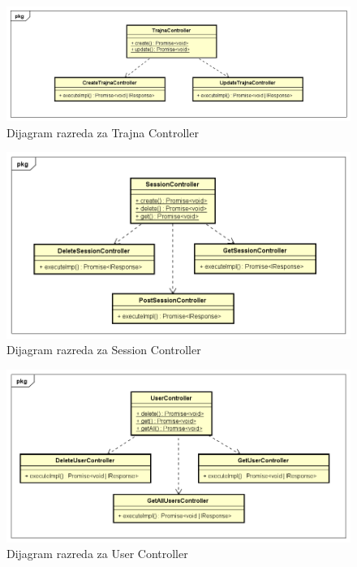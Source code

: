 		\begin{figure}[H]
			\includegraphics[width=1\linewidth]{dijagrami/Dijagram razreda - TrajnaController.png}
			\caption{Dijagram razreda za Trajna Controller}
			\label{fig:Dijagram razreda - TrajnaController} 
		\end{figure}
		
		\begin{figure}[H]
			\includegraphics[width=1\linewidth]{dijagrami/Dijagram razreda - SessionController.png}
			\caption{Dijagram razreda za Session Controller}
			\label{fig:Dijagram razreda - SessionController} 
		\end{figure}
		
		\begin{figure}[H]
			\includegraphics[width=1\linewidth]{dijagrami/Dijagram razreda - UserController.png}
			\caption{Dijagram razreda za User Controller}
			\label{fig:Dijagram razreda - UserController} 
		\end{figure}
		
